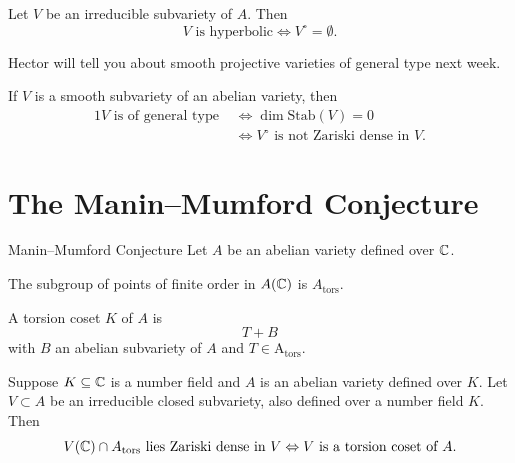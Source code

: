 \documentclass{beamer}
\begin{document}
\begin{frame}
  \begin{theorem} Let $V$ be an irreducible subvariety of $A$. 
    Then
    $$\text{$V$ is hyperbolic}\Longleftrightarrow
    V^{\circ}=\emptyset. $$
  \end{theorem}

  Hector will tell you about \alert{smooth projective varieties of
    general type} next week.

  If $V$ is a smooth subvariety of an abelian variety, then 
  \begin{alignat*}1
    V \text{ is of general type }&\Leftrightarrow\dim
    \mathrm{Stab}(V)=0 \\
    &\Leftrightarrow
    \text{$V^{\circ}$ is
      not Zariski dense in $V$.}
  \end{alignat*}
\end{frame}

\section{The Manin--Mumford Conjecture}

\begin{frame}{Manin--Mumford Conjecture}
  Let $A$ be an abelian variety defined over ${\mathbb{C}}$.
  
  \begin{definition}
    The subgroup of points of finite order in $A({\mathbb{C}})$ is
    $A_{\mathrm{tors}}$.
    
    A \alert{torsion coset} $K$ of $A$
    is
    $$ T+B $$
    with $B$ an abelian subvariety of $A$ and $T\in\mathrm{A}_{\mathrm{tors}}$. 
  \end{definition}

  \begin{theorem}

  Suppose $K\subseteq{\mathbb{C}}$ is a number field and $A$ is an abelian
  variety defined over $K$. 
  Let $V\subset A$ be an irreducible closed subvariety, also defined over a
  number field $K$. Then
  \begin{equation*}
    V({\mathbb{C}}) \cap A_{\mathrm{tors}} \text{ lies Zariski dense in
      $V$}\Leftrightarrow 
    \text{$V$ is a torsion coset of $A$.}
  \end{equation*}
\end{theorem}
\end{frame}

\end{document}
